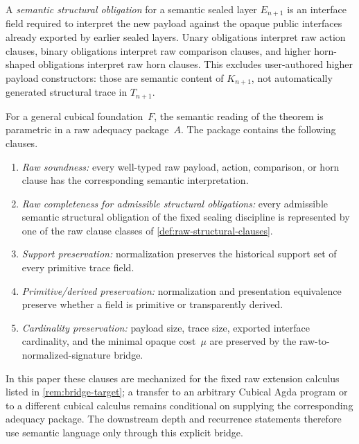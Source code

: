 \documentclass{lmcs}
\begin{document}
\begin{defi}
\label{def:semantic-structural-obligations}
A \emph{semantic structural obligation} for a semantic sealed layer
$E_{n+1}$ is an interface field required to interpret the new payload against
the opaque public interfaces already exported by earlier sealed layers. Unary
obligations interpret raw action clauses, binary obligations interpret raw
comparison clauses, and higher horn-shaped obligations interpret raw horn
clauses. This excludes user-authored higher payload constructors: those are
semantic content of $K_{n+1}$, not automatically generated structural trace in
$T_{n+1}$.
\end{defi}

\begin{rem}
\label{rem:semantic-adequacy-package}
For a general cubical foundation~$F$, the semantic reading of the theorem is
parametric in a raw adequacy package~$A$. The package contains the following
clauses.
\begin{enumerate}
  \item \emph{Raw soundness:} every well-typed raw payload, action,
  comparison, or horn clause has the corresponding semantic interpretation.
  \item \emph{Raw completeness for admissible structural obligations:} every
  admissible semantic structural obligation of the fixed sealing discipline is
  represented by one of the raw clause classes of
  \autoref{def:raw-structural-clauses}.
  \item \emph{Support preservation:} normalization preserves the historical
  support set of every primitive trace field.
  \item \emph{Primitive/derived preservation:} normalization and presentation
  equivalence preserve whether a field is primitive or transparently derived.
  \item \emph{Cardinality preservation:} payload size, trace size, exported
  interface cardinality, and the minimal opaque cost~$\mu$ are preserved by the
  raw-to-normalized-signature bridge.
\end{enumerate}
In this paper these clauses are mechanized for the fixed raw extension calculus
listed in \autoref{rem:bridge-target}; a transfer to an arbitrary Cubical Agda
program or to a different cubical calculus remains conditional on supplying the
corresponding adequacy package. The downstream depth and recurrence statements
therefore use semantic language only through this explicit bridge.
\end{rem}
\end{document}
